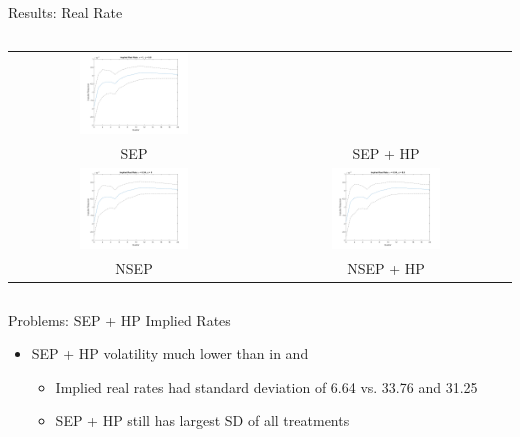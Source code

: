 \documentclass{beamer}
\begin{document}
\begin{frame}{Results: Real Rate}
\begin{columns}
\begin{tabular}{cc}
  \includegraphics[width=0.45\textwidth]{figs/irf/real_implied_2.png} \\
  SEP & SEP + HP \\
  \includegraphics[width=0.45\textwidth]{figs/irf/real_implied_3.png} &
  \includegraphics[width=0.45\textwidth]{figs/irf/real_implied_4.png} \\
  NSEP & NSEP + HP
\end{tabular}
\end{columns}
\end{frame}


\begin{frame}{Problems: SEP + HP Implied Rates}
\begin{itemize}
\item SEP + HP volatility much lower than in \cite{collard11} and \cite{canzoneri07}
  \begin{itemize}
  \item Implied real rates had standard deviation of 6.64 vs. 33.76 and 31.25
  \item SEP + HP still has largest SD of all treatments
  \end{itemize}
\end{itemize}
\end{frame}
\end{document}
